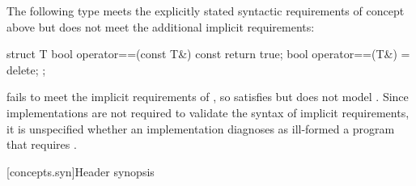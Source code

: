 \pnum
\begin{example}
The following type  meets the explicitly stated syntactic requirements
of concept  above but does not meet the additional implicit
requirements:

\begin{codeblock}
struct T {
  bool operator==(const T&) const { return true; }
  bool operator==(T&) = delete;
};
\end{codeblock}

 fails to meet the implicit requirements of ,
so  satisfies but does not model .
Since implementations are not required to validate the syntax
of implicit requirements, it is unspecified whether an implementation diagnoses
as ill-formed a program that requires .
\end{example}

[concepts.syn]{Header  synopsis}


